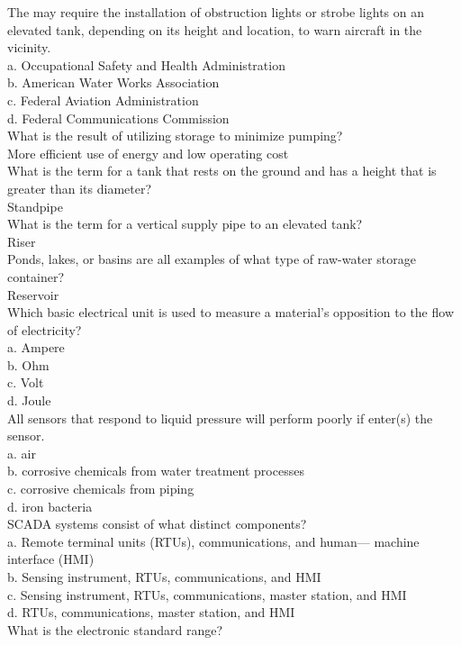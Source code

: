 The 	may require the installation of obstruction lights or strobe lights on an elevated tank, depending on its height and location, to warn aircraft in the vicinity.\\
a.	Occupational Safety and Health Administration\\
b.	American Water Works Association\\
c.	Federal Aviation Administration\\
d.	Federal Communications Commission\\
What is the result of utilizing storage to minimize pumping?\\
More efficient use of energy and low operating cost\\
What is the term for a tank that rests on the ground and has a height that is greater than its diameter?\\
Standpipe\\
What is the term for a vertical supply pipe to an elevated tank?\\
Riser\\
Ponds, lakes, or basins are all examples of what type of raw-water storage container?\\
Reservoir\\
Which basic electrical unit is used to measure a material's opposition to the flow of electricity?\\
a.	Ampere\\
b.	Ohm\\
c.	Volt\\
d.	Joule\\
All sensors that respond to liquid pressure will perform poorly if	enter(s) the sensor.\\
a.	air\\
b.	corrosive chemicals from water treatment processes\\
c.	corrosive chemicals from piping\\
d.	iron bacteria\\
SCADA systems consist of what distinct components?\\
a.	Remote terminal units (RTUs), communications, and human— machine interface (HMI)\\
b.	Sensing instrument, RTUs, communications, and HMI\\
c.	Sensing instrument, RTUs, communications, master station, and HMI\\
d.	RTUs, communications, master station, and HMI\\
What is the electronic standard range?\\
